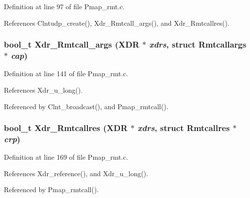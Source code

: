 Definition at line 97 of file Pmap\_\-rmt.c.

References Clntudp\_\-create(), Xdr\_\-Rmtcall\_\-args(), and Xdr\_\-Rmtcallres().
\subsubsection{\setlength{\rightskip}{0pt plus 5cm}bool\_\-t Xdr\_\-Rmtcall\_\-args (XDR $\ast$ {\em xdrs}, struct Rmtcallargs $\ast$ {\em cap})}\label{Pmap__rmt_8c_a3}




Definition at line 141 of file Pmap\_\-rmt.c.

References Xdr\_\-u\_\-long().

Referenced by Clnt\_\-broadcast(), and Pmap\_\-rmtcall().
\subsubsection{\setlength{\rightskip}{0pt plus 5cm}bool\_\-t Xdr\_\-Rmtcallres (XDR $\ast$ {\em xdrs}, struct Rmtcallres $\ast$ {\em crp})}\label{Pmap__rmt_8c_a4}




Definition at line 169 of file Pmap\_\-rmt.c.

References Xdr\_\-reference(), and Xdr\_\-u\_\-long().

Referenced by Pmap\_\-rmtcall().